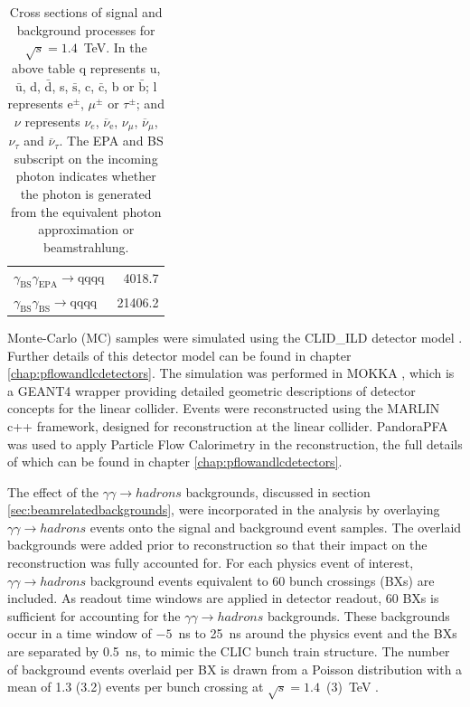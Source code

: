 \begin{table}[h!]
\begin{tabular}{ l r }
$\gamma_{\text{BS}}\gamma_{\text{EPA}} \rightarrow \text{qqqq}$ & 4018.7\\
$\gamma_{\text{BS}}\gamma_{\text{BS}} \rightarrow \text{qqqq}$ & 21406.2\\
\hline
\end{tabular}
\caption[Cross sections of signal and background processes for $\sqrt{s}=1.4$~TeV]{Cross sections of signal and background processes for $\sqrt{s}=1.4$~TeV.  In the above table q represents u, $\bar{\text{u}}$, d, $\bar{\text{d}}$, s, $\bar{\text{s}}$, c, $\bar{\text{c}}$, b or $\bar{\text{b}}$;  l represents $\text{e}^{\pm}$, $\mu^{\pm}$ or $\tau^{\pm}$; and $\nu$ represents $\nu_{e}$, $\overline{\nu}_{\text{e}}$, $\nu_{\mu}$, $\overline{\nu}_{\mu}$, $\nu_{\tau}$ and $\overline{\nu}_{\tau}$.  The EPA and BS subscript on the incoming photon indicates whether the photon is generated from the equivalent photon approximation or beamstrahlung.}
\label{table:crosssection1400GeV}
\end{table}

Monte-Carlo (MC) samples were simulated using the CLID\_ILD detector model \cite{arXiv:1006.3396}.  Further details of this detector model can be found in chapter \ref{chap:pflowandlcdetectors}.  The simulation was performed in MOKKA \cite{MoradeFreitas:2002kj}, which is a GEANT4 \cite{Agostinelli:2002hh} wrapper providing detailed geometric descriptions of detector concepts for the linear collider.  Events were reconstructed using the MARLIN \cite{Gaede:2006pj} c++ framework, designed for reconstruction at the linear collider.  PandoraPFA \cite{arXiv:0907.3577, arXiv:1209.4039} was used to apply Particle Flow Calorimetry in the reconstruction, the full details of which can be found in chapter \ref{chap:pflowandlcdetectors}.
  
The effect of the $\gamma\gamma \rightarrow hadrons$ backgrounds, discussed in section \ref{sec:beamrelatedbackgrounds}, were incorporated in the analysis by overlaying $\gamma\gamma \rightarrow hadrons$ events onto the signal and background event samples.  The overlaid backgrounds were added prior to reconstruction so that their impact on the reconstruction was fully accounted for.  For each physics event of interest, $\gamma\gamma \rightarrow hadrons$ background events equivalent to 60 bunch crossings (BXs) are included.  As readout time windows are applied in detector readout, 60 BXs is sufficient for accounting for the $\gamma\gamma \rightarrow hadrons$ backgrounds.  These backgrounds occur in a time window of $-5$~ns to 25~ns around the physics event and the BXs are separated by 0.5~ns, to mimic the CLIC bunch train structure.  The number of background events overlaid per BX is drawn from a Poisson distribution with a mean of 1.3 (3.2) events per bunch crossing at $\sqrt{s}=1.4$~(3)~TeV \cite{Linssen:2012hp}.  

